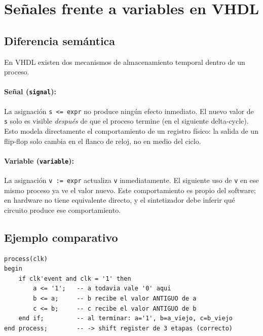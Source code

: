 \documentclass[memoria_final]{subfiles}
\begin{document}
\newpage
\appendix
\section{Señales frente a variables en VHDL}
\label{sec:senales-variables}

\subsection{Diferencia semántica}

En VHDL existen dos mecanismos de almacenamiento temporal dentro de un proceso.

\paragraph{Señal (\texttt{signal}):} La asignación \texttt{s <= expr} no
produce ningún efecto inmediato. El nuevo valor de \texttt{s} solo es visible
\textit{después} de que el proceso termine (en el siguiente delta-cycle).
Esto modela directamente el comportamiento de un registro físico: la salida
de un flip-flop solo cambia en el flanco de reloj, no en medio del ciclo.

\paragraph{Variable (\texttt{variable}):} La asignación \texttt{v := expr}
actualiza \texttt{v} inmediatamente. El siguiente uso de \texttt{v} en ese
mismo proceso ya ve el valor nuevo. Este comportamiento es propio del
software; en hardware no tiene equivalente directo, y el sintetizador debe
inferir qué circuito produce ese comportamiento.

\subsection{Ejemplo comparativo}

\begin{lstlisting}[caption={Shift register con señales (correcto)}]
process(clk)
begin
    if clk'event and clk = '1' then
        a <= '1';   -- a todavia vale '0' aqui
        b <= a;     -- b recibe el valor ANTIGUO de a
        c <= b;     -- c recibe el valor ANTIGUO de b
    end if;         -- al terminar: a='1', b=a_viejo, c=b_viejo
end process;        -- -> shift register de 3 etapas (correcto)
\end{lstlisting}
\end{document}
